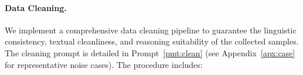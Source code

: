 

\paragraph{Data Cleaning.}



We implement a comprehensive data cleaning pipeline to guarantee the linguistic consistency, textual cleanliness, and reasoning suitability of the collected samples. The cleaning prompt is detailed in Prompt~\ref{pmt:clean} (see Appendix~\ref{apx:case} for representative noise cases). The procedure includes:

